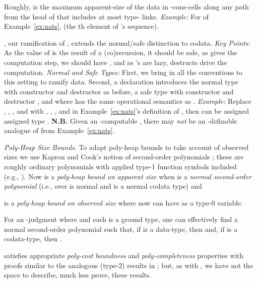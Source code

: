 \documentclass[envcountsame]{llncs}
\newcommand{\Topic}[1]{\smallskip\noindent{\textbf{#1{.}}}\enspace}
\begin{document}
Roughly,  is the maximum apparent-size of the
data in -cons-cells along any path from the head of 
that includes at most  type- links.  \emph{Example:} For
 of Example~\ref{ex:nats},
(the th element of 's
sequence).



\Topic{The Ramified Case}
, our ramification of , extends the normal/safe distinction
to codata.  \emph{Key Points:} As the value of
 is the result of a (co)recursion, it should be
safe,  as  gives the computation step, we should have
, and as 's are lazy, 
destructs drive the computation.
 \emph{Normal and Safe
  Types:} First, we bring in all the
 conventions to this setting to ramify data.
Second, a declaration
 introduces the normal type  with
constructor  and destructor  as before, a
safe type  with constructor  and destructor
, and
 where  has
the same operational semantics as .  \emph{Example:}
Replace , ,  , and 
with , ,  , and
 in
Example~\ref{ex:nats}'s definition of , then  can be
assigned assigned type .  
\textbf{N.B.}
Given an -computable , there may 
\emph{not} be an -definable analogue of  from
Example~\ref{ex:nats}.

 
\emph{Poly-Heap Size Bounds.} 
To adapt poly-heap bounds to take account of observed sizes we use
Kapron and Cook's notion of second-order polynomials
\cite{KapronCook:mach}; these are roughly ordinary polynomials with
applied type-1 function symbols included (e.g.,
).  Now  
is a \emph{poly-heap bound on apparent size} when  is a 
\emph{normal second-order polynomial} 
(i.e., over  is normal 
and  is a normal codata type)
and 
 
is a \emph{poly-heap bound on observed size} where now 
can have 
as a type-0 variable.

\begin{theorem} \label{t:RS:size}
  For an -judgment  where
   and each  is a ground type, one
  can effectively find a normal second-order polynomial  such
  that, if  is a data-type, then  and, if  is a codata-type, then
  .
\end{theorem}

 satisfies appropriate \emph{poly-cost boundness}
and \emph{poly-completeness} properties with proofs similar to the
analogous (type-2) results in \cite{DR:ATS:LMCS,DannerRoyer:2algs};
but, as with , we have not the space to describe, much less
prove, these results.
\end{document}
